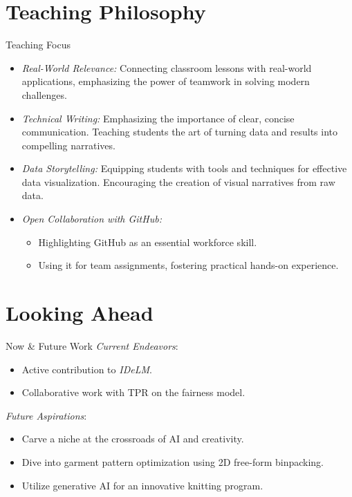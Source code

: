 \documentclass[
    NAME={Dr. Helga Ingimundardóttir},
    EMAIL={helgaingim@hi.is},
    FACULTY={Industrial Engineering},
    SUBTITLE={From Smart Algorithms in Fish Portioning to Pioneering Pipelines in Long-Range DNA Sequencing and Digital Travel},
    SEMINAR={IVT Faculty Gathering},
    DATE={September 6, 2023}
]{hi-latex/hi-beamer}
\begin{document}
\section{Teaching Philosophy}
\begin{frame}{Teaching Focus}
    \begin{itemize}
        \item \emph{Real-World Relevance:} Connecting classroom lessons with real-world applications,
        emphasizing the power of teamwork in solving modern challenges.

        \item \emph{Technical Writing:} Emphasizing the importance of clear, concise communication.
        Teaching students the art of turning data and results into compelling narratives.

        \item \emph{Data Storytelling:} Equipping students with tools and techniques for effective data visualization.
        Encouraging the creation of visual narratives from raw data.

        \item \emph{Open Collaboration with GitHub:}
            \begin{itemize}
                \item Highlighting GitHub as an essential workforce skill.
                \item Using it for team assignments, fostering practical hands-on experience.
            \end{itemize}

    \end{itemize}
\end{frame}


\section{Looking Ahead}
\begin{frame}{Now \& Future Work}
\emph{Current Endeavors}:
    \begin{itemize}
        \item Active contribution to \emph{IDeLM}.
        \item Collaborative work with TPR on the fairness model.
    \end{itemize}
    \bigskip
\emph{Future Aspirations}:
        \begin{itemize}
            \item Carve a niche at the crossroads of AI and creativity.
            \item Dive into garment pattern optimization using 2D free-form binpacking.
            \item Utilize generative AI for an innovative knitting program.
        \end{itemize}
\end{frame}
\end{document}
